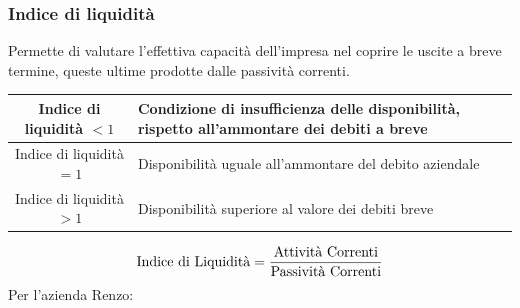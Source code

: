 \documentclass{article}
\renewcommand{\arraystretch}{1.5}
\begin{document}
\subsubsection{Indice di liquidità}
Permette di valutare l'effettiva capacità dell'impresa nel coprire le uscite a breve termine, queste ultime prodotte dalle passività correnti.
\begin{center}
    \renewcommand{\arraystretch}{2}
    \begin{tabular}{|c|l|}
        \hline
        Indice di liquidità $<1$ & Condizione di insufficienza delle
        disponibilità, rispetto
        all'ammontare dei debiti a breve\\
        \hline
        Indice di liquidità $= 1$ & Disponibilità uguale
        all'ammontare del debito
        aziendale\\
        \hline
        Indice di liquidità $> 1$ & Disponibilità superiore al valore
        dei debiti breve\\
        \hline
    \end{tabular}
\end{center}
\[
    \text{Indice di Liquidità} = \frac{\text{Attività Correnti}}{\text{Passività Correnti}}
\]
Per l'azienda Renzo:
\end{document}
